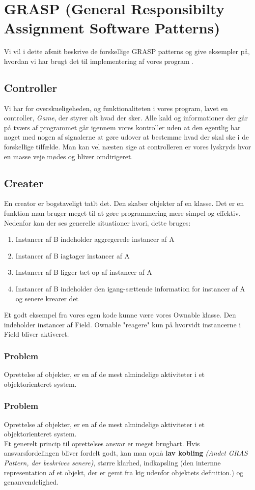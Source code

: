 \section{GRASP (General Responsibilty Assignment Software Patterns)}
Vi vil i dette afsnit beskrive de forskellige GRASP patterns og give eksempler på, hvordan vi har brugt det til implementering af vores program \cite{Larman}.
\subsection{Controller}
Vi har for overskueligeheden, og funktionaliteten i vores program, lavet en controller, \textit{Game}, der styrer alt hvad der sker. Alle kald og informationer der går på tværs af programmet går igennem vores kontroller uden at den egentlig har noget med nogen af signalerne at gøre udover at bestemme hvad der skal ske i de forskellige tilfælde. Man kan vel næsten sige at controlleren er vores lyskryds hvor en masse veje mødes og bliver omdirigeret.  
\subsection{Creater}
En creator er bogstaveligt tatlt det. Den skaber objekter af en klasse. Det er en funktion man bruger meget til at gøre programmering mere simpel og effektiv. Nedenfor kan der ses generelle situationer hvori, dette bruges:
\begin{enumerate}
\item Instancer af B indeholder aggregerede instancer af A
\item Instancer af B iagtager instancer af A
\item Instancer af B ligger tæt op af instancer af A
\item Instancer af B indeholder den igang-sættende information for instancer af A og senere krearer det
\end{enumerate}
Et godt eksempel fra vores egen kode kunne være vores Ownable klasse. Den indeholder instancer af Field. Ownable "reagere" kun på hvorvidt instancerne i Field bliver aktiveret. 
\subsubsection*{Problem}
Oprettelse af objekter, er en af de mest almindelige aktiviteter i et objektorienteret system.
\\
\subsubsection*{Problem}
Oprettelse af objekter, er en af de mest almindelige aktiviteter i et objektorienteret system.
\\
Et generelt princip til oprettelses ansvar er meget brugbart. Hvis ansvarsfordelingen bliver fordelt godt, kan man opnå \textbf{lav kobling} \textit{(Andet GRAS Pattern, der beskrives senere)}, større klarhed, indkapsling (den internne representation af et objekt, der er gemt fra kig udenfor objektets definition.) og genanvendelighed.
